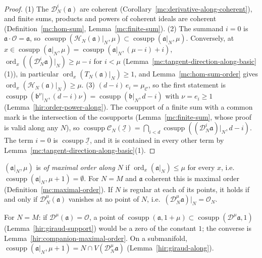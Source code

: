 \begin{proof}
\leanok
(1) The \(\mathcal D_N^i(\mathfrak a)\) are coherent (Corollary~\ref{mc:derivative-along-coherent}), and finite sums, products and powers of coherent ideals are coherent
(Definition~\ref{mc:hom-sum}, Lemma~\ref{mc:finite-sum}).
(2) The summand \(i=0\) is \(\mathfrak a\cdot\mathcal O=\mathfrak a\), so \(\operatorname{cosupp}(\mathcal H_N(\mathfrak a)|_N,\mu)\subset\operatorname{cosupp}(\mathfrak a|_N,\mu)\). Conversely, at
\(x\in\operatorname{cosupp}(\mathfrak a|_N,\mu)=\operatorname{cosupp}(\mathfrak a|_N,(\mu-i)+i)\), \(\operatorname{ord}_x((\mathcal D_N^i\mathfrak a)|_N)\ge\mu-i\) for \(i<\mu\)
(Lemma~\ref{mc:tangent-direction-along-basic}(1)), in particular \(\operatorname{ord}_x(T_N(\mathfrak a)|_N)\ge1\), and Lemma~\ref{mc:hom-sum-order} gives
\(\operatorname{ord}_x(\mathcal H_N(\mathfrak a)|_N)\ge\mu\).
(3) \((d-i)\,e_i=\mu_{\mathcal C}\), so the first statement is \(\operatorname{cosupp}(\mathfrak b^{\nu}|_N,(d-i)\nu)=\operatorname{cosupp}(\mathfrak b|_N,d-i)\) with \(\nu=e_i\ge1\)
(Lemma~\ref{hir:order-power-along}). The cosupport of a finite sum with a common mark is the intersection of the cosupports (Lemma~\ref{mc:finite-sum}, whose proof
is valid along any \(N\)), so \(\operatorname{cosupp}\mathcal C_N(\underline{\mathcal I})=\bigcap_{i<d}\operatorname{cosupp}((\mathcal D_N^i\mathfrak a)|_N,d-i)\). The term \(i=0\) is
\(\operatorname{cosupp}\underline{\mathcal I}\), and it is contained in every other term by Lemma~\ref{mc:tangent-direction-along-basic}(1).
\end{proof}

\begin{definition}
\label{mc:maximal-order-along}
\leanok
\((\mathfrak a|_N,\mu)\) is \emph{of maximal order along \(N\)} if \(\operatorname{ord}_x(\mathfrak a|_N)\le\mu\) for every \(x\), i.e.\
\(\operatorname{cosupp}(\mathfrak a|_N,\mu+1)=\emptyset\). For \(N=M\) and \(\mathfrak a\) coherent this is maximal order (Definition~\ref{mc:maximal-order}). If \(N\) is
regular at each of its points, it holds if and only if \(\mathcal D_N^\mu(\mathfrak a)\) vanishes at no point of \(N\), i.e.\ \((\mathcal D_N^\mu\mathfrak a)|_N=\mathcal O_N\).
\end{definition}
For \(N=M\): if \(\mathcal D^\mu(\mathfrak a)=\mathcal O\), a point of \(\operatorname{cosupp}(\mathfrak a,1+\mu)\subset\operatorname{cosupp}(\mathcal D^\mu\mathfrak a,1)\)
(Lemma~\ref{hir:giraud-support}) would be a zero of the constant \(1\); the converse is Lemma~\ref{hir:companion-maximal-order}. On a submanifold,
\(\operatorname{cosupp}(\mathfrak a|_N,\mu+1)=N\cap V(\mathcal D_N^\mu\mathfrak a)\) (Lemma~\ref{hir:giraud-along}).

